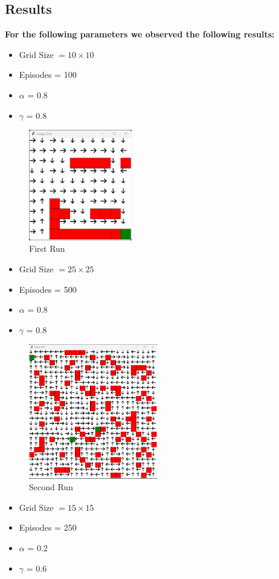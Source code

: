 \documentclass{article}
\begin{document}
\subsection{Results}

\textbf{For the following parameters we observed the following results:}
\begin{itemize}
    \item Grid Size $= 10 \times 10$
    \item Episodes = 100
    \item $\alpha$ = 0.8 
    \item $\gamma$ = 0.8
\end{itemize}

\begin{figure}[H]
  \centering
  \includegraphics[width=0.4\textwidth, height=0.25\textheight]{grid_1.png}
  \caption{First Run}
\end{figure}

\begin{itemize}
    \item Grid Size $= 25 \times 25$
    \item Episodes = 500
    \item $\alpha$ = 0.8 
    \item $\gamma$ = 0.8
\end{itemize}

\begin{figure}[H]
  \centering
  \includegraphics[width=0.5\textwidth, height=0.3\textheight]{grid_2.png}
  \caption{Second Run}
\end{figure}
\begin{itemize}
    \item Grid Size $= 15 \times 15$
    \item Episodes = 250
    \item $\alpha$ = 0.2 
    \item $\gamma$ = 0.6
\end{itemize}
\end{document}
